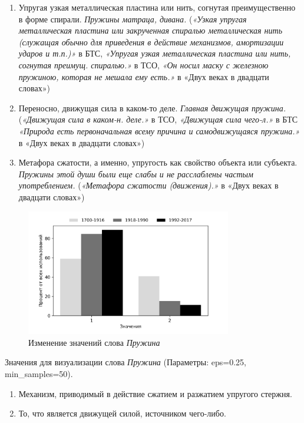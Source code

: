 \begin{enumerate}
    \item Упругая узкая металлическая пластина или нить, согнутая преимущественно в форме спирали. \textit{Пружины матраца, дивана.}
(\textit{«Узкая упругая металлическая пластина или закрученная спиралью металлическая нить
(служащая обычно для приведения в действие механизмов, амортизации ударов и т.п.)»} в БТС,
\textit{«Упругая узкая металлическая пластина или нить, согнутая преимущ. спиралью.»} в ТСО,
\textit{«Он носил маску с железною пружиною, которая не мешала ему есть.»} в «Двух веках в двадцати словах»)

    \item Переносно, движущая сила в каком-то деле. \textit{Главная движущая пружина.}
(\textit{«Движущая сила в каком-н. деле.»} в ТСО, \textit{«Движущая сила чего-л.»} в БТС
\textit{«Природа есть первоначальная всему причина и самодвижущаяся пружина.»} в «Двух веках в двадцати словах»)

    \item Метафора сжатости, а именно, упругость как свойство объекта или субъекта. \textit{Пружины этой души были еще слабы и не расслаблены частым употреблением.}
(\textit{«Метафора сжатости (движения).»} в «Двух веках в двадцати словах»)
\end{enumerate}

\begin{figure}[H]
	\centering
	\includegraphics[width=0.8\textwidth]{img/visualizations/pruzhina_minimal}
	\caption{Изменение значений слова \textit{Пружина}}
	\label{fig:Пружина}
\end{figure}

Значения для визуализации слова \textit{Пружина} (Параметры: eps=0.25, min\_samples=50).

\begin{enumerate}
    \item Механизм, приводимый в действие сжатием и разжатием упругого стержня.
    \item То, что является движущей силой, источником чего-либо.
\end{enumerate}

